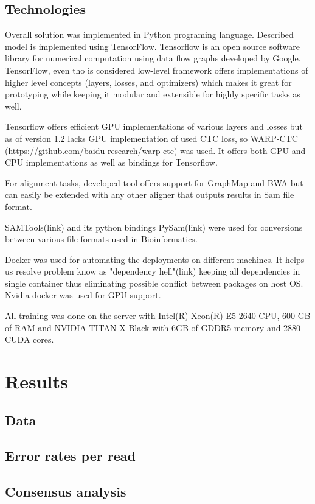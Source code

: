 \documentclass[times, utf8, diplomski, english]{fer}
\begin{document}
\section{Technologies}

Overall solution was implemented in Python programing language. Described model is implemented using TensorFlow. Tensorflow is an open source software library for numerical computation using data flow graphs developed by Google.  TensorFlow, even tho is considered low-level framework offers implementations of higher level concepts (layers, losses, and optimizers) which makes it great for prototyping while keeping it modular and extensible for highly specific tasks as well.

Tensorflow offers efficient GPU implementations of various layers and losses but as of version 1.2 lacks GPU implementation of used CTC loss, so WARP-CTC (https://github.com/baidu-research/warp-ctc) was used. It offers both GPU and CPU implementations as well as bindings for Tensorflow.

For alignment tasks, developed tool offers support for GraphMap and BWA but can easily be extended with any other aligner that outputs results in Sam file format.

SAMTools(link) and its python bindings PySam(link) were used for conversions between various file formats used in Bioinformatics.

Docker was used for automating the deployments on different machines. It helps us resolve problem know as  "dependency hell"(link)  keeping all dependencies in single container thus eliminating possible conflict between packages on host OS.
Nvidia docker was used for GPU support.

All training was done on the server with  Intel(R) Xeon(R) E5-2640 CPU, 600 GB of RAM and NVIDIA TITAN X Black with 6GB of GDDR5 memory and 2880 CUDA cores.
\chapter{Results}
\section{Data}
\section{Error rates per read}
\section{Consensus analysis}
\end{document}
